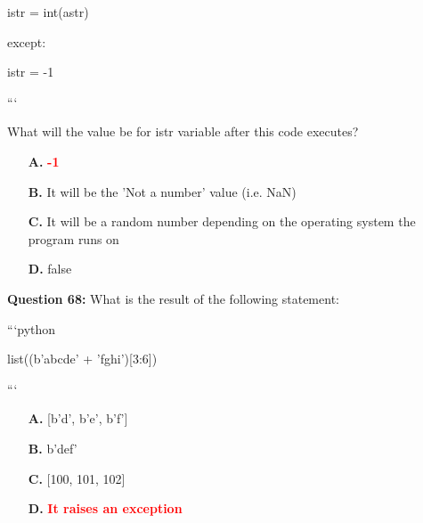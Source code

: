 \documentclass[12pt,a4paper]{article}
\begin{document}
\newline
    istr = int(astr)\newline

\newline
except:\newline

\newline
    istr = -1\newline

\newline
```\newline

\newline
\newline

\newline
What will the value be for istr variable after this code executes?

\begin{itemize}
    \item[\textbf{A.}] \textcolor{red}{\textbf{-1}}
    \item[\textbf{B.}] It will be the 'Not a number' value (i.e. NaN)
    \item[\textbf{C.}] It will be a random number depending on the operating system the program runs on
    \item[\textbf{D.}] false
\end{itemize}

\vspace{0.5cm}

\textbf{Question 68:} What is the result of the following statement:\newline

\newline
\newline

\newline
```python\newline

\newline
list((b'abcde' + 'fghi')[3:6])\newline

\newline
```

\begin{itemize}
    \item[\textbf{A.}] [b'd', b'e', b'f']
    \item[\textbf{B.}] b'def'
    \item[\textbf{C.}] [100, 101, 102]
    \item[\textbf{D.}] \textcolor{red}{\textbf{It raises an exception}}
\end{itemize}
\end{document}

